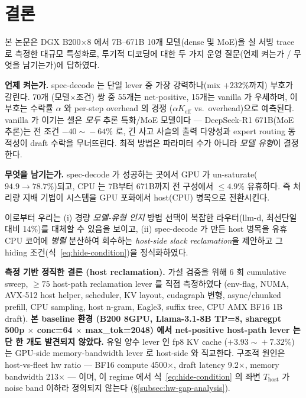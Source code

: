 
\section{결론}
\label{sec:conclusion}

본 논문은 DGX B200$\times$8 에서 7B--671B 10개 모델(dense 및 MoE)을
실 서빙 trace 로 측정한 대규모 특성화로, 투기적 디코딩에 대한
두 가지 운영 질문(언제 켜는가 / 무엇을 남기는가)에 답하였다.

\textbf{언제 켜는가.}
spec-decode 는 단일 lever 중 가장 강력하나(mix $+232\%$까지) 부호가 갈린다.
70개 (모델$\times$조건) 쌍 중 55개는 net-positive, 15개는 vanilla 가 우세하며,
이 부호는 수락률 $\alpha$ 와 per-step overhead 의 경쟁
($\alpha K_{\mathrm{eff}}$ vs.\ overhead)으로 예측된다.
vanilla 가 이기는 셀은 \emph{모두} 추론 특화/MoE 모델이다 ---
DeepSeek-R1 671B(MoE 추론)는 전 조건 $-40\!\sim\!-64\%$ 로, 긴 사고 사슬의 출력 다양성과
expert routing 동적성이 draft 수락을 무너뜨린다.
최적 방법은 파라미터 수가 아니라 \emph{모델 유형}이 결정한다.

\textbf{무엇을 남기는가.}
spec-decode 가 성공하는 곳에서 GPU 가 un-saturate($94.9\!\to\!78.7\%$)되고,
CPU 는 7B부터 671B까지 전 구성에서 $\le4.9\%$ 유휴하다.
즉 처리량 지배 기법이 시스템을 GPU 포화에서 host(CPU) 병목으로 전환시킨다.

이로부터 우리는 (i) 경량 \emph{모델-유형 인지} 방법 선택이 복잡한 라우터(llm-d, 최선단일 대비 14\%)를
대체할 수 있음을 보이고, (ii) spec-decode 가 만든 host 병목을 유휴 CPU 코어에 \emph{병렬} 분산하여 회수하는
\emph{host-side slack reclamation}을 제안하고 그 hiding 조건(식~\ref{eq:hide-condition})을 정식화하였다.

\textbf{측정 기반 정직한 결론 (host reclamation).}
가설 검증을 위해 6 회 cumulative sweep, $\ge\!75$ host-path reclamation lever 를 직접 측정하였다
(env-flag, NUMA, AVX-512 host helper, scheduler, KV layout, cudagraph 변형,
async/chunked prefill, CPU sampling, host n-gram, Eagle3, suffix tree, CPU AMX BF16 1B draft).
\textbf{본 baseline 환경 (B200 8GPU, Llama-3.1-8B TP=8, sharegpt 500p $\times$ conc=64 $\times$ max\_tok=2048)
에서 net-positive host-path lever 는 단 한 개도 발견되지 않았다.}
유일 양수 lever 인 fp8 KV cache ($+3.93\!\sim\!+7.32\%$) 는 GPU-side memory-bandwidth lever 로
host-side 와 직교한다.
구조적 원인은 host-vs-fleet hw ratio --- BF16 compute 4500$\times$, draft latency 9.2$\times$,
memory bandwidth 213$\times$ --- 이며, 이 regime 에서 식~\ref{eq:hide-condition} 의 좌변
$T_{\mathrm{host}}$ 가 noise band 이하라 정의되지 않는다 (\S\ref{subsec:hw-gap-analysis}).

